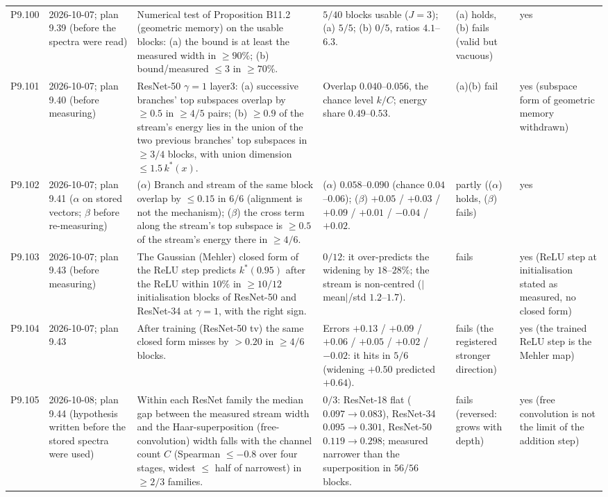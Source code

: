 \begin{longtable}{p{1.1cm}p{1.4cm}p{6.2cm}p{4.6cm}p{2.0cm}p{1.6cm}}
P9.100 & 2026-10-07; plan 9.39 (before the spectra were read) & Numerical test of Proposition B11.2 (geometric memory) on the usable blocks: (a) the bound is at least the measured width in $\ge 90\%$; (b) bound/measured $\le 3$ in $\ge 70\%$. & $5/40$ blocks usable ($J = 3$); (a) $5/5$; (b) $0/5$, ratios $4.1$--$6.3$. & (a) holds, (b) fails (valid but vacuous) & yes \\
P9.101 & 2026-10-07; plan 9.40 (before measuring) & ResNet-50 $\gamma = 1$ layer3: (a) successive branches' top subspaces overlap by $\ge 0.5$ in $\ge 4/5$ pairs; (b) $\ge 0.9$ of the stream's energy lies in the union of the two previous branches' top subspaces in $\ge 3/4$ blocks, with union dimension $\le 1.5\,k^*(x)$. & Overlap $0.040$--$0.056$, the chance level $k/C$; energy share $0.49$--$0.53$. & (a)(b) fail & yes (subspace form of geometric memory withdrawn) \\
P9.102 & 2026-10-07; plan 9.41 ($\alpha$ on stored vectors; $\beta$ before re-measuring) & ($\alpha$) Branch and stream of the same block overlap by $\le 0.15$ in $6/6$ (alignment is not the mechanism); ($\beta$) the cross term along the stream's top subspace is $\ge 0.5$ of the stream's energy there in $\ge 4/6$. & ($\alpha$) $0.058$--$0.090$ (chance $0.04$--$0.06$); ($\beta$) $+0.05$ / $+0.03$ / $+0.09$ / $+0.01$ / $-0.04$ / $+0.02$. & partly (($\alpha$) holds, ($\beta$) fails) & yes \\
P9.103 & 2026-10-07; plan 9.43 (before measuring) & The Gaussian (Mehler) closed form of the ReLU step predicts $k^*(0.95)$ after the ReLU within $10\%$ in $\ge 10/12$ initialisation blocks of ResNet-50 and ResNet-34 at $\gamma = 1$, with the right sign. & $0/12$: it over-predicts the widening by $18$--$28\%$; the stream is non-centred ($|$mean$|$/std $1.2$--$1.7$). & fails & yes (ReLU step at initialisation stated as measured, no closed form) \\
P9.104 & 2026-10-07; plan 9.43 & After training (ResNet-50 tv) the same closed form misses by $> 0.20$ in $\ge 4/6$ blocks. & Errors $+0.13$ / $+0.09$ / $+0.06$ / $+0.05$ / $+0.02$ / $-0.02$: it hits in $5/6$ (widening $+0.50$ predicted $+0.64$). & fails (the registered stronger direction) & yes (the trained ReLU step is the Mehler map) \\
P9.105 & 2026-10-08; plan 9.44 (hypothesis written before the stored spectra were used) & Within each ResNet family the median gap between the measured stream width and the Haar-superposition (free-convolution) width falls with the channel count $C$ (Spearman $\le -0.8$ over four stages, widest $\le$ half of narrowest) in $\ge 2/3$ families. & $0/3$: ResNet-18 flat ($0.097 \to 0.083$), ResNet-34 $0.095 \to 0.301$, ResNet-50 $0.119 \to 0.298$; measured narrower than the superposition in $56/56$ blocks. & fails (reversed: grows with depth) & yes (free convolution is not the limit of the addition step) \\

\end{longtable}
